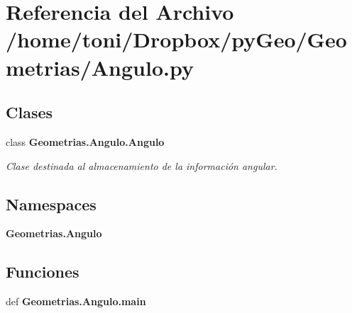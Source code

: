 \section{Referencia del Archivo /home/toni/\-Dropbox/py\-Geo/\-Geometrias/\-Angulo.py}
\label{Angulo_8py}
\subsection*{Clases}
\begin{DoxyCompactItemize}
\item 
class {\bf Geometrias.\-Angulo.\-Angulo}
\begin{DoxyCompactList}\small\item\em Clase destinada al almacenamiento de la información angular. \end{DoxyCompactList}\end{DoxyCompactItemize}
\subsection*{Namespaces}
\begin{DoxyCompactItemize}
\item 
{\bf Geometrias.\-Angulo}
\end{DoxyCompactItemize}
\subsection*{Funciones}
\begin{DoxyCompactItemize}
\item 
def {\bf Geometrias.\-Angulo.\-main}
\end{DoxyCompactItemize}
